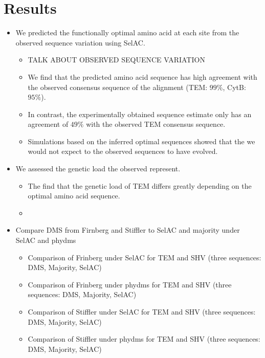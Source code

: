 \documentclass[12pt]{article}
\begin{document}
\section*{Results}
\begin{itemize}
	\item We predicted the functionally optimal amino acid at each site from the observed sequence variation using SelAC.
	\begin{itemize}
		\item TALK ABOUT OBSERVED SEQUENCE VARIATION
		\item We find that the predicted amino acid sequence has high agreement with the observed consensus sequence of the alignment (TEM: $99 \%$, CytB: $95 \%$).
		\item In contrast, the experimentally obtained sequence estimate only has an agreement of $49 \%$ with the observed TEM consensus sequence.
		\item Simulations based on the inferred optimal sequences showed that the we would not expect to the observed sequences to have evolved.
	\end{itemize}
	\item We assessed the genetic load the observed represent.
	\begin{itemize}
		\item The find that the genetic load of TEM differs greatly depending on the optimal amino acid sequence.
		\item 
	\end{itemize}

	\item Compare DMS from Firnberg and Stiffler to SelAC and majority under SelAC and phydms
	\begin{itemize}
		\item Comparison of Frinberg under SelAC for TEM and SHV (three sequences: DMS, Majority, SelAC)
		\item Comparison of Frinberg under phydms for TEM and SHV (three sequences: DMS, Majority, SelAC)
		\item Comparison of Stiffler under SelAC for TEM and SHV (three sequences: DMS, Majority, SelAC)
		\item Comparison of Stiffler under phydms for TEM and SHV (three sequences: DMS, Majority, SelAC)
	\end{itemize}
\end{itemize}
\end{document}
